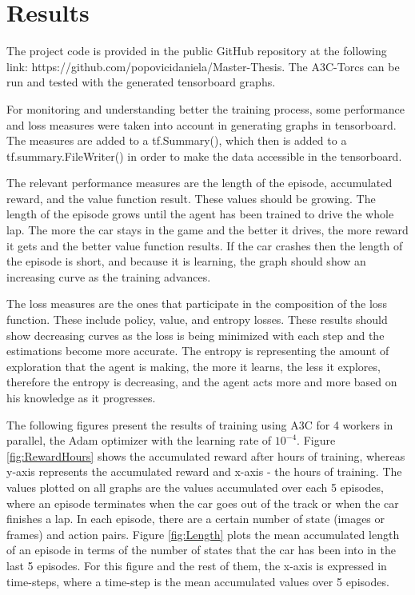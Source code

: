 \chapter{Results}
\label{cha:Result}
The project code is provided in the public GitHub repository at the following link: https://github.com/popovicidaniela/Master-Thesis.
The A3C-Torcs can be run and tested with the generated tensorboard graphs.

For monitoring and understanding better the training process, some performance and loss measures were taken into account in generating graphs in tensorboard. The measures are added to a tf.Summary(), which then is added to a tf.summary.FileWriter() in order to make the data accessible in the tensorboard.

The relevant performance measures are the length of the episode, accumulated reward, and the value function result. These values should be growing. The length of the episode grows until the agent has been trained to drive the whole lap. The more the car stays in the game and the better it drives, the more reward it gets and the better value function results. If the car crashes then the length of the episode is short, and because it is learning, the graph should show an increasing curve as the training advances. 

The loss measures are the ones that participate in the composition of the loss function. These include policy, value, and entropy losses. These results should show decreasing curves as the loss is being minimized with each step and the estimations become more accurate. The entropy is representing the amount of exploration that the agent is making, the more it learns, the less it explores, therefore the entropy is decreasing, and the agent acts more and more based on his knowledge as it progresses.

The following figures present the results of training using A3C for 4 workers in parallel, the Adam optimizer with the learning rate of $10^{-4}$. Figure \ref{fig:RewardHours} shows the accumulated reward after hours of training, whereas y-axis represents the accumulated reward and x-axis - the hours of training. The values plotted on all graphs are the values accumulated over each 5 episodes, where an episode terminates when the car goes out of the track or when the car finishes a lap. In each episode, there are a certain number of state (images or frames) and action pairs. Figure \ref{fig:Length} plots the mean accumulated length of an episode in terms of the number of states that the car has been into in the last 5 episodes. For this figure and the rest of them, the x-axis is expressed in time-steps, where a time-step is the mean accumulated values over 5 episodes.

